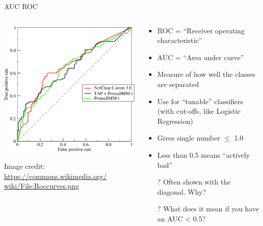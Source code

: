 \documentclass[aspectratio=169]{beamer}
\begin{document}
\begin{frame}{AUC ROC}

\begin{columns}
\begin{column}{0.5\textwidth}
    \includegraphics[width=1\textwidth]{lectSup/Roccurves}
   
   \vspace{-1em}
    {\tiny Image credit: \url{https://commons.wikimedia.org/
    wiki/File:Roccurves.png}}
\end{column}
\begin{column}{0.5\textwidth}

\begin{itemize}
	\item ROC = ``Receiver operating characteristic'' 
	\item AUC = ``Area under curve''
	\item Measure of how well the classes are separated
	\item Use for ``tunable'' classifiers (with cut-offs, like Logistic Regression)
	\item Gives single number $\le$ 1.0
	\item Less than 0.5 means ``actively bad''
	\item[?] Often shown with the diagonal. Why?
	\item[?] What does it mean if you have an AUC < 0.5? %
\end{itemize}
\end{column}
\end{columns}
\end{frame}
\end{document}
